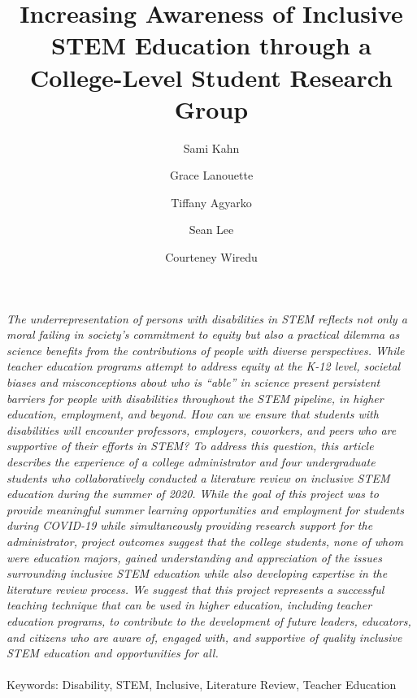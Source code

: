 \documentclass[11.5pt]{sig-alternate}
\makeatletter
\let\oldabstract\abstract
\let\oldendabstract\endabstract
\renewenvironment{abstract}
{\renewenvironment{quotation}%
               {\list{}{\addtolength{\leftmargin}{1em} %
                        \listparindent 1.5em%
                        \itemindent    \listparindent%
                        \rightmargin   \leftmargin%
                        \parsep        \z@ \@plus\p@}%
                \item\relax}%
               {\endlist}%
\oldabstract}
{\oldendabstract}
\makeatother
\begin{document}
\title{Increasing Awareness of Inclusive STEM Education through a College-Level Student Research Group}

\author[1]{\large \color{blue}Sami Kahn}
\author[1]{\large \color{blue}Grace Lanouette}
\author[1]{\large \color{blue}Tiffany Agyarko}
\author[1]{\large \color{blue}Sean Lee}
\author[1]{\large \color{blue}Courteney Wiredu}



\toappear{}
\maketitle
\begin{@twocolumnfalse} 
\begin{abstract}
\item 
 \textit {The underrepresentation of persons with disabilities in STEM reflects not only a moral failing in society’s commitment to equity but also a practical dilemma as science benefits from the contributions of people with diverse perspectives. While teacher education programs attempt to address equity at the K-12 level, societal biases and misconceptions about who is “able” in science present persistent barriers for people with disabilities throughout the STEM pipeline, in higher education, employment, and beyond. How can we ensure that students with disabilities will encounter professors, employers, coworkers, and peers who are supportive of their efforts in STEM? To address this question, this article describes the experience of a college administrator and four undergraduate students who collaboratively conducted a literature review on inclusive STEM education during the summer of 2020. While the goal of this project was to provide meaningful summer learning opportunities and employment for students during COVID-19 while simultaneously providing research support for the administrator, project outcomes suggest that the college students, none of whom were education majors, gained understanding and appreciation of the issues surrounding inclusive STEM education while also developing expertise in the literature review process. We suggest that this project represents a successful teaching technique that can be used in higher education, including teacher education programs, to contribute to the development of future leaders, educators, and citizens who are aware of, engaged with, and supportive of quality inclusive STEM education and opportunities for all.}
\\
\\
Keywords: Disability, STEM, Inclusive, Literature Review, Teacher Education
\end{abstract}
\end{@twocolumnfalse}
\end{document}
